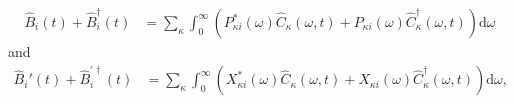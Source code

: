 \documentclass{article}
\begin{document}
\begin{equation}
\begin{split}
\hat{B}_i(t) + \hat{B}_i^\dagger(t)
&= \sum_\kappa\int_0^\infty\left(P_{\kappa i}^*(\omega)\hat{C}_\kappa(\omega,t) + P_{\kappa i}(\omega)\hat{C}_\kappa^\dagger(\omega,t)\right)\mathrm{d}\omega
\end{split}
\end{equation}
and
\begin{equation}
\begin{split}
\hat{B}_i'(t) + \hat{B}_i^{\prime\dagger}(t) 
&= \sum_\kappa\int_0^\infty\left(X_{\kappa i}^*(\omega)\hat{C}_\kappa(\omega,t) + X_{\kappa i}(\omega)\hat{C}_\kappa^\dagger(\omega,t)\right)\mathrm{d}\omega,
\end{split}
\end{equation}
\end{document}
